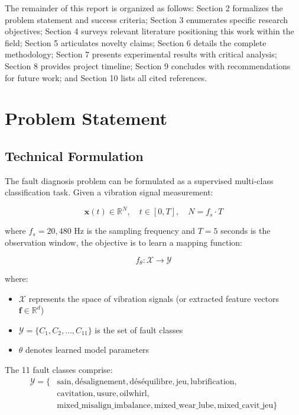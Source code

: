 \documentclass[11pt,a4paper]{article}
\begin{document}
The remainder of this report is organized as follows: Section 2 formalizes the problem statement and success criteria; Section 3 enumerates specific research objectives; Section 4 surveys relevant literature positioning this work within the field; Section 5 articulates novelty claims; Section 6 details the complete methodology; Section 7 presents experimental results with critical analysis; Section 8 provides project timeline; Section 9 concludes with recommendations for future work; and Section 10 lists all cited references.

\section{Problem Statement}

\subsection{Technical Formulation}

The fault diagnosis problem can be formulated as a supervised multi-class classification task. Given a vibration signal measurement:

\begin{equation}
\mathbf{x}(t) \in \mathbb{R}^N, \quad t \in [0, T], \quad N = f_s \cdot T
\end{equation}

where $f_s = 20{,}480$ Hz is the sampling frequency and $T = 5$ seconds is the observation window, the objective is to learn a mapping function:

\begin{equation}
f_\theta: \mathcal{X} \rightarrow \mathcal{Y}
\end{equation}

where:
\begin{itemize}[itemsep=0.2em]
    \item $\mathcal{X}$ represents the space of vibration signals (or extracted feature vectors $\mathbf{f} \in \mathbb{R}^d$)
    \item $\mathcal{Y} = \{C_1, C_2, \ldots, C_{11}\}$ is the set of fault classes
    \item $\theta$ denotes learned model parameters
\end{itemize}

The 11 fault classes comprise:
\begin{align}
\mathcal{Y} = \{&\text{sain}, \text{désalignement}, \text{déséquilibre}, \text{jeu}, \text{lubrification}, \nonumber \\
&\text{cavitation}, \text{usure}, \text{oilwhirl}, \nonumber \\
&\text{mixed\_misalign\_imbalance}, \text{mixed\_wear\_lube}, \text{mixed\_cavit\_jeu}\}
\end{align}
\end{document}
